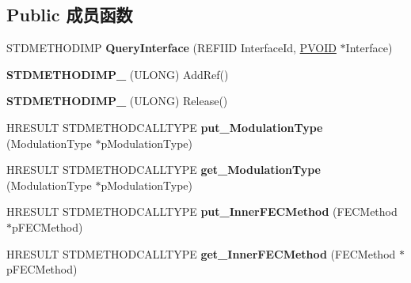 \subsection*{Public 成员函数}
\begin{DoxyCompactItemize}
\item 
\mbox{\label{class_c_b_d_a_digital_demodulator_a834c7cfb8e66ff9350f7388283c42938}} 
S\+T\+D\+M\+E\+T\+H\+O\+D\+I\+MP {\bfseries Query\+Interface} (R\+E\+F\+I\+ID Interface\+Id, \hyperlink{interfacevoid}{P\+V\+O\+ID} $\ast$Interface)
\item 
\mbox{\label{class_c_b_d_a_digital_demodulator_a1c205de15a0f2341a302cc6f86417c45}} 
{\bfseries S\+T\+D\+M\+E\+T\+H\+O\+D\+I\+M\+P\+\_\+} (U\+L\+O\+NG) Add\+Ref()
\item 
\mbox{\label{class_c_b_d_a_digital_demodulator_a30ae3fb939d94dfc93fea1c5c60c3f15}} 
{\bfseries S\+T\+D\+M\+E\+T\+H\+O\+D\+I\+M\+P\+\_\+} (U\+L\+O\+NG) Release()
\item 
\mbox{\label{class_c_b_d_a_digital_demodulator_a6ee6d74f8c6a7a1a8a5fffa20ca86da3}} 
H\+R\+E\+S\+U\+LT S\+T\+D\+M\+E\+T\+H\+O\+D\+C\+A\+L\+L\+T\+Y\+PE {\bfseries put\+\_\+\+Modulation\+Type} (Modulation\+Type $\ast$p\+Modulation\+Type)
\item 
\mbox{\label{class_c_b_d_a_digital_demodulator_a0b22073251afbe34c0544b7daca42abc}} 
H\+R\+E\+S\+U\+LT S\+T\+D\+M\+E\+T\+H\+O\+D\+C\+A\+L\+L\+T\+Y\+PE {\bfseries get\+\_\+\+Modulation\+Type} (Modulation\+Type $\ast$p\+Modulation\+Type)
\item 
\mbox{\label{class_c_b_d_a_digital_demodulator_a1a08a09d7617c84c67b410a7e6f255b1}} 
H\+R\+E\+S\+U\+LT S\+T\+D\+M\+E\+T\+H\+O\+D\+C\+A\+L\+L\+T\+Y\+PE {\bfseries put\+\_\+\+Inner\+F\+E\+C\+Method} (F\+E\+C\+Method $\ast$p\+F\+E\+C\+Method)
\item 
\mbox{\label{class_c_b_d_a_digital_demodulator_a8559158b46c840d1aa01e06ec228ae30}} 
H\+R\+E\+S\+U\+LT S\+T\+D\+M\+E\+T\+H\+O\+D\+C\+A\+L\+L\+T\+Y\+PE {\bfseries get\+\_\+\+Inner\+F\+E\+C\+Method} (F\+E\+C\+Method $\ast$p\+F\+E\+C\+Method)

\end{DoxyCompactItemize}
